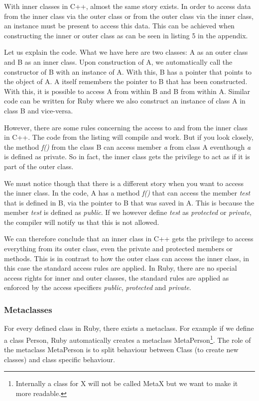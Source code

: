 \documentclass[10pt,a4paper,twocolumn]{article}
\begin{document}
With inner classes in C++, almost the same story exists. In order to access data from the inner class via the outer class or from the outer class via the inner class, an instance must be present to access this data. This can be achieved when constructing the inner or outer class as can be seen in listing 5 in the appendix.

Let us explain the code. What we have here are two classes: A as an outer class and B as an inner class. Upon construction of A, we automatically call the constructor of B with an instance of A. With this, B has a pointer that points to the object of A. A itself remembers the pointer to B that has been constructed. With this, it is possible to access A from within B and B from within A. Similar code can be written for Ruby where we also construct an instance of class A in class B and vice-versa.

However, there are some rules concerning the access to and from the inner class in C++. The code from the listing will compile and work. But if you look closely, the method \textit{f()} from the class B can access member \textit{a} from class A eventhough \textit{a} is defined as private. So in fact, the inner class gets the privilege to act as if it is part of the outer class.

We must notice though that there is a different story when you want to access the inner class. In the code, A has a method \textit{f()} that can access the member \textit{test} that is defined in B, via the pointer to B that was saved in A. This is because the member \textit{test} is defined as \textit{public}. If we however define \textit{test} as \textit{protected} or \textit{private}, the compiler will notify us that this is not allowed.

We can therefore conclude that an inner class in C++ gets the privilege to access everything from its outer class, even the private and protected members or methods. This is in contrast to how the outer class can access the inner class, in this case the standard access rules are applied. In Ruby, there are no special access rights for inner and outer classes, the standard rules are applied as enforced by the access specifiers \textit{public}, \textit{protected} and \textit{private}.

\subsubsection{Metaclasses}
For every defined class in Ruby, there exists a metaclass. For example if we define a class Person, Ruby automatically creates a metaclass MetaPerson\footnote{Internally a class for X will not be called MetaX but we want to make it more readable.}. The role of the metaclass MetaPerson is to split behaviour between Class (to create new classes) and class specific behaviour.
\end{document}
